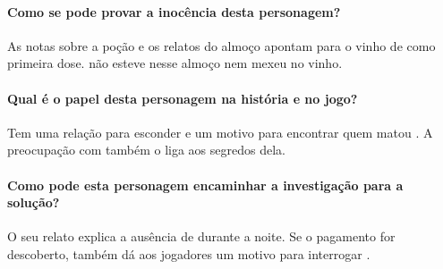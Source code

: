 {{\paragraph{Como se pode provar a inocência desta personagem?}
As notas sobre a poção e os relatos do almoço apontam para o vinho de  como primeira dose.  não esteve nesse almoço nem mexeu no vinho.

\paragraph{Qual é o papel desta personagem na história e no jogo?}
Tem uma relação para esconder e um motivo para encontrar quem matou . A preocupação com  também o liga aos segredos dela.

\paragraph{Como pode esta personagem encaminhar a investigação para a solução?}
O seu relato explica a ausência de  durante a noite. Se o pagamento for descoberto, também dá aos jogadores um motivo para interrogar .
}
}
